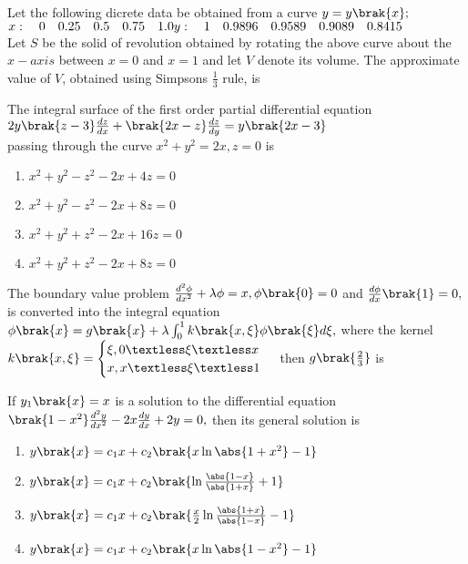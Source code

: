     \item Let the following dicrete data be obtained from a curve $y=y\brak{x};$\\
    $x: \quad 0 \quad 0.25  \quad 0.5  \quad  0.75  \quad 1.0\\
    y: \quad 1 \quad 0.9896 \quad 0.9589\quad 0.9089 \quad 0.8415$\\
    Let $S$ be the solid of revolution obtained by rotating the above curve about the $x-axis$ between $x=0$ and $x=1$ and let $V$ denote its volume. The approximate value of $V$, obtained using Simpsons $\frac{1}{3}$ rule, is\\
    \item The integral surface of the first order partial differential equation\\
    $2y\brak{z-3}\frac{dz}{dx}+\brak{2x-z}\frac{dz}{dy}=y\brak{2x-3}$\\
    passing through the curve $x^2+y^2=2x,z=0$ is
    \begin{enumerate}
        \item $x^2+y^2-z^2-2x+4z=0$
        \item $x^2+y^2-z^2-2x+8z=0$
        \item $x^2+y^2+z^2-2x+16z=0$
        \item $x^2+y^2+z^2-2x+8z=0$\\
    \end{enumerate}
    \item The boundary value problem $\frac{d^2\phi}{dx^2}+\lambda\phi=x, \phi\brak{0}=0$ and $\frac{d\phi}{dx}\brak{1}=0,$ is converted into the integral equation $\phi\brak{x}=g\brak{x}+\lambda\int_{0}^{1}k\brak{x,\xi}\phi\brak{\xi}d\xi,$ where the kernel $k\brak{x,\xi }=\begin{cases}
    \xi,0\textless\xi\textless x\\x,x\textless \xi \textless 1
    \end{cases} $ then $g\brak{\frac{2}{3}}$ is\\
    \item If $y_1\brak{x}=x$ is a solution to the differential equation $\brak{1-x^2}\frac{d^2y}{dx^2}-2x\frac{dy}{dx}+2y=0,$ then its general solution is 
    \begin{enumerate}
        \item $y\brak{x}=c_1x+c_2\brak{x\ln\abs{1+x^2}-1}$
        \item $y\brak{x}=c_1x+c_2\brak{\ln\frac{\abs{1-x}}{\abs{1+x}}+1}$
        \item $y\brak{x}=c_1x+c_2\brak{\frac{x}{2}\ln\frac{\abs{1+x}}{\abs{1-x}}-1}$
        \item $y\brak{x}=c_1x+c_2\brak{x\ln\abs{1-x^2}-1}$\\
    \end{enumerate}

